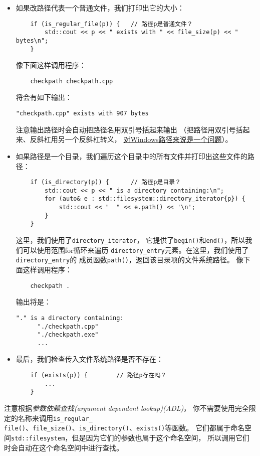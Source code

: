 \begin{itemize}
    \item 如果改路径代表一个普通文件，我们打印出它的大小：
    \begin{lstlisting}
    if (is_regular_file(p)) {   // 路径p是普通文件？
        std::cout << p << " exists with " << file_size(p) << " bytes\n";
    }
    \end{lstlisting}
    像下面这样调用程序：
    \begin{lstlisting}
    checkpath checkpath.cpp
    \end{lstlisting}
    将会有如下输出：
    \begin{lstlisting}[stringstyle=\color{black}]
    "checkpath.cpp" exists with 907 bytes
    \end{lstlisting}
    注意输出路径时会自动把路径名用双引号括起来输出
    （把路径用双引号括起来、反斜杠用另一个反斜杠转义，
    \hyperref[ch20.1.1.1]{对Windows路径来说是一个问题}）。
    \item 如果路径是一个目录，我们遍历这个目录中的所有文件并打印出这些文件的路径：
    \begin{lstlisting}
    if (is_directory(p)) {      // 路径p是目录？
        std::cout << p << " is a directory containing:\n";
        for (auto& e : std::filesystem::directory_iterator{p}) {
            std::cout << "  " << e.path() << '\n';
        }
    }
    \end{lstlisting}
    这里，我们使用了\texttt{directory\_iterator}，
    它提供了\texttt{begin()}和\texttt{end()}，所以我们可以使用范围for循环来遍历
    \texttt{directory\_entry}元素。在这里，我们使用了\texttt{directory\_entry}的
    成员函数\texttt{path()}，返回该目录项的文件系统路径。
    像下面这样调用程序：
    \begin{lstlisting}
    checkpath .
    \end{lstlisting}
    输出将是：
    \begin{lstlisting}[stringstyle=\color{black}]
    "." is a directory containing:
      "./checkpath.cpp"
      "./checkpath.exe"
      ...
    \end{lstlisting}
    \item 最后，我们检查传入文件系统路径是否不存在：
    \begin{lstlisting}
    if (exists(p)) {        // 路径p存在吗？
        ...
    }
    \end{lstlisting}
\end{itemize}
注意根据\emph{参数依赖查找(argument dependent lookup)(ADL)}，
你不需要使用完全限定的名称来调用\texttt{is\_regular\_\\
file()}、\texttt{file\_size()}、\texttt{is\_directory()}、\texttt{exists()}等函数。
它们都属于命名空间\texttt{std::filesystem}，但是因为它们的参数也属于这个命名空间，
所以调用它们时会自动在这个命名空间中进行查找。

